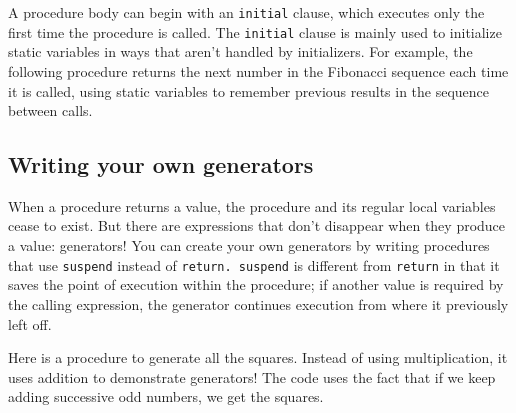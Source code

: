 A procedure body can begin with an \texttt{initial} clause, which executes only the first time
the procedure is called. The \texttt{initial} clause is mainly used
to initialize static variables in ways that aren't
handled by initializers. For example, the following procedure returns
the next number in the Fibonacci sequence each time it is
called, using static variables to remember previous results in the
sequence between calls.


\subsection*{Writing your own generators}

When a procedure returns a value, the procedure and its
regular local variables cease to exist. But there are expressions that
don't disappear when they produce a value: generators!
You can create your own generators by writing procedures that use
\texttt{suspend} instead of \texttt{return. suspend} is different from
\texttt{return} in that it saves the point of execution within the
procedure; if another value is required by the calling expression, the
generator continues execution from where it previously left off.

Here is a procedure to generate all the squares. Instead of using
multiplication, it uses addition to demonstrate generators! The code
uses the fact that if we keep adding successive odd numbers, we get the
squares.


